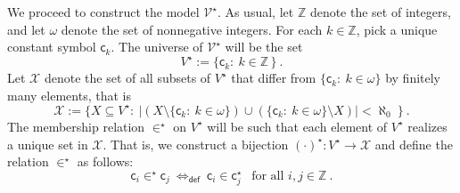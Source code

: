 \documentclass[10pt,a4paper, openany,  oldfontcommands]{memoir}
\newtheorem{open problem} [theorem] {Open Problem}
\begin{document}
 
 
 
  



  





We proceed to construct the model       $   \mathcal{V}^{ \star }    $.
As usual, let  $  \mathbb{Z} $  denote the set of integers, and let $  \omega $ denote the set of nonnegative integers. 
For each  $ k \in  \mathbb{Z}  $,    pick a unique constant symbol $  \mathsf{c}_k $.  
The universe of   $  \mathcal{V}^{  \star }  $   will be  the set   
\[
  V^{  \star }  :=  \big\{    \mathsf{c}_k   :   \   k  \in \mathbb{Z}      \,    \big\}  
  \        .
 \] 
Let   $  \mathcal{X} $  denote the set of all subsets of   $    V^{  \star }  $  that differ from  
$   \lbrace    \mathsf{c}_k   :   \   k  \in \omega   \rbrace   $   by finitely many elements, that is 
\[
 \mathcal{X}  :=  
 \bigg\{    X  \subseteq  V^{  \star }    :   \  
    \vert    \left(  X  \setminus  \lbrace    \mathsf{c}_k   :   \   k  \in \omega   \rbrace   \right)  
\cup   
 \left(    \lbrace    \mathsf{c}_k   :   \   k  \in \omega     \rbrace    \setminus X \right)     \vert    <   \aleph_0 
 \      \bigg\}
 \          .
\]
The membership relation  $  \in^{  \star }  $  on   $  V^{  \star }    $ will be such that each element of $  V^{  \star }   $ realizes  a unique  set in   $   \mathcal{X}  $. 
That is, we construct a  bijection        $   ( \cdot )^{ \star }   :     V^{  \star }    \to   \mathcal{X}    $
and  define the  relation   $  \in^{  \star }  $ as follows: 
 \[
    \mathsf{c}_i   \in^{  \star }   \mathsf{c}_j  
\    \Leftrightarrow_{  \mathsf{def}  }     \       
      \mathsf{c}_i    \in   \mathsf{c}_j^{  \star }  
      \     \     \mbox{  for all }   i, j  \in  \mathbb{Z} 
      \        .
\]      
\end{document}
